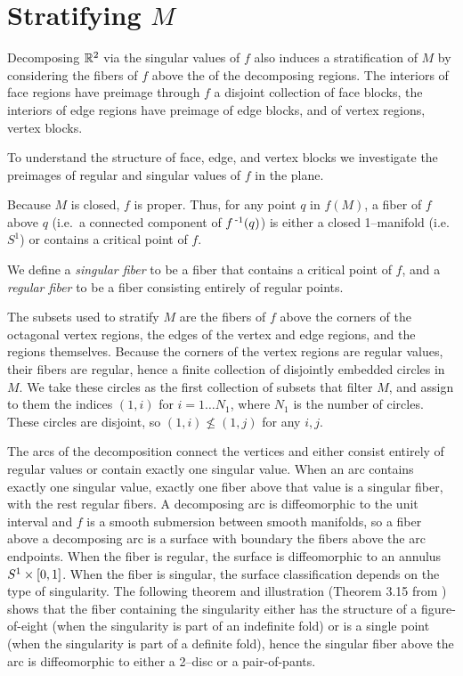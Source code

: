 \section{Stratifying $M$}

Decomposing $\mathbb{R}^2$ via the singular values of $f$ also induces a stratification of $M$
by considering the fibers of $f$ above the of the decomposing regions.
The interiors of face regions have preimage through $f$ a disjoint collection of face blocks, the interiors of edge regions have preimage of edge blocks, and of vertex regions, vertex blocks.

To understand the structure of face, edge, and vertex blocks we investigate the preimages of regular and singular values of $f$ in the plane.
\begin{defn}
	Because $M$ is closed, $f$ is proper.
	Thus, for any point $q$ in $f(M)$, a fiber of $f$ above $q$ (i.e.\ a connected component of $f^{\,\text{-}1}(q)$) is either a closed 1--manifold (i.e.\ $S^1$) or contains a critical point of $f$.
	
	We define a \emph{singular fiber} to be a fiber that contains a critical point of $f$, and a \emph{regular fiber} to be a fiber consisting entirely of regular points.	
\end{defn}

The subsets used to stratify $M$ are the fibers of $f$ above the corners of the octagonal vertex regions, the edges of the vertex and edge regions, and the regions themselves.
Because the corners of the vertex regions are regular values, their fibers are regular, hence a finite collection of disjointly embedded circles in $M$.
We take these circles as the first collection of subsets that filter $M$, and assign to them the indices $(1,i)$ for $i = 1\dots N_1$, where $N_1$ is the number of circles.
These circles are disjoint, so $(1,i)\nleq (1,j)$ for any $i,j$.

The arcs of the decomposition connect the vertices and either consist entirely of regular values or contain exactly one singular value.
When an arc contains exactly one singular value, exactly one fiber above that value is a singular fiber, with the rest regular fibers.
A decomposing arc is diffeomorphic to the unit interval and $f$ is a smooth submersion between smooth manifolds, so a fiber above a decomposing arc is a surface with boundary the fibers above the arc endpoints.
When the fiber is regular, the surface is diffeomorphic to an annulus $S^1\times[0,1]$.
When the fiber is singular, the surface classification depends on the type of singularity.
The following theorem and illustration (Theorem 3.15 from \cite{Saeki}) shows that the fiber containing the singularity either has the structure of a figure-of-eight (when the singularity is part of an indefinite fold) or is a single point (when the singularity is part of a definite fold), hence the singular fiber above the arc is diffeomorphic to either a 2--disc or a pair-of-pants.

